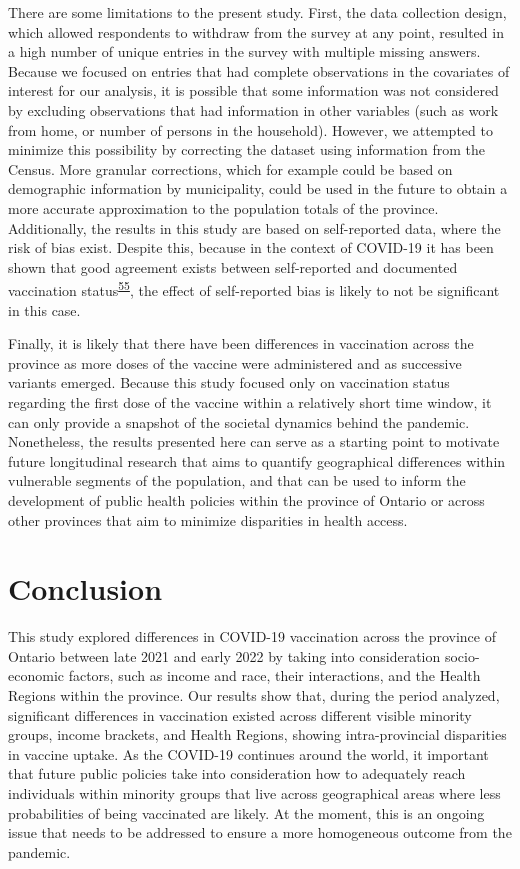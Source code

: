\documentclass[
  letterpaper,
  DIV=11,
  numbers=noendperiod]{scrartcl}
\begin{document}
There are some limitations to the present study. First, the data
collection design, which allowed respondents to withdraw from the survey
at any point, resulted in a high number of unique entries in the survey
with multiple missing answers. Because we focused on entries that had
complete observations in the covariates of interest for our analysis, it
is possible that some information was not considered by excluding
observations that had information in other variables (such as work from
home, or number of persons in the household). However, we attempted to
minimize this possibility by correcting the dataset using information
from the Census. More granular corrections, which for example could be
based on demographic information by municipality, could be used in the
future to obtain a more accurate approximation to the population totals
of the province. Additionally, the results in this study are based on
self-reported data, where the risk of bias exist. Despite this, because
in the context of COVID-19 it has been shown that good agreement exists
between self-reported and documented vaccination
status\textsuperscript{\protect\hyperlink{ref-stephenson2022}{55}}, the
effect of self-reported bias is likely to not be significant in this
case.

Finally, it is likely that there have been differences in vaccination
across the province as more doses of the vaccine were administered and
as successive variants emerged. Because this study focused only on
vaccination status regarding the first dose of the vaccine within a
relatively short time window, it can only provide a snapshot of the
societal dynamics behind the pandemic. Nonetheless, the results
presented here can serve as a starting point to motivate future
longitudinal research that aims to quantify geographical differences
within vulnerable segments of the population, and that can be used to
inform the development of public health policies within the province of
Ontario or across other provinces that aim to minimize disparities in
health access.

\hypertarget{conclusion}{%
\section{Conclusion}\label{conclusion}}

This study explored differences in COVID-19 vaccination across the
province of Ontario between late 2021 and early 2022 by taking into
consideration socio-economic factors, such as income and race, their
interactions, and the Health Regions within the province. Our results
show that, during the period analyzed, significant differences in
vaccination existed across different visible minority groups, income
brackets, and Health Regions, showing intra-provincial disparities in
vaccine uptake. As the COVID-19 continues around the world, it important
that future public policies take into consideration how to adequately
reach individuals within minority groups that live across geographical
areas where less probabilities of being vaccinated are likely. At the
moment, this is an ongoing issue that needs to be addressed to ensure a
more homogeneous outcome from the pandemic.
\end{document}
